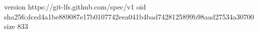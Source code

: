 version https://git-lfs.github.com/spec/v1
oid sha256:dced4a1be889087e17b0107742eea041b4bad7428125899b98aad27534a30700
size 833
